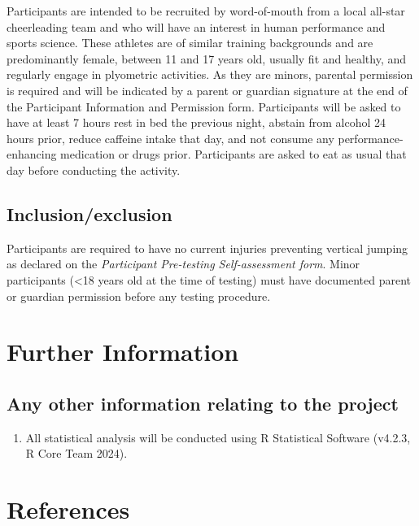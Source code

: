 \documentclass[stu, floatsintext, a4paper]{apa7}
\begin{document}
Participants are intended to be recruited by word-of-mouth from a local all-star cheerleading team and who will have an interest in human performance and sports science. These athletes are of similar training backgrounds and are predominantly female, between 11 and 17 years old, usually fit and healthy, and regularly engage in plyometric activities. As they are minors, parental permission is required and will be indicated by a parent or guardian signature at the end of the Participant Information and Permission form. Participants will be asked to have at least 7 hours rest in bed the previous night, abstain from alcohol 24 hours prior, reduce caffeine intake that day, and not consume any performance-enhancing medication or drugs prior. Participants are asked to eat as usual that day before conducting the activity.

\subsection{Inclusion/exclusion}
\label{sec:org1b86d2f}

Participants are required to have no current injuries preventing vertical jumping as declared on the \emph{Participant Pre-testing Self-assessment form}. Minor participants (<18 years old at the time of testing) must have documented parent or guardian permission before any testing procedure.

\section{Further Information}
\label{sec:org929ff9a}

\subsection{Any other information relating to the project}
\label{sec:org70d713a}
\begin{enumerate}
\item All statistical analysis will be conducted using R Statistical Software (v4.2.3, R Core Team 2024).
\end{enumerate}

\section{References}
\label{sec:orgf8d6d0d}
\end{document}
